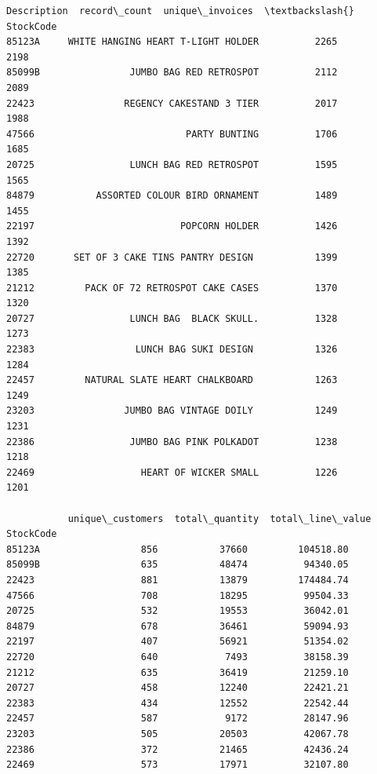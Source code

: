 \documentclass[11pt]{article}
\begin{document}
    
    \begin{Verbatim}[commandchars=\\\{\}]
                                  Description  record\_count  unique\_invoices  \textbackslash{}
StockCode                                                                      
85123A     WHITE HANGING HEART T-LIGHT HOLDER          2265             2198   
85099B                JUMBO BAG RED RETROSPOT          2112             2089   
22423                REGENCY CAKESTAND 3 TIER          2017             1988   
47566                           PARTY BUNTING          1706             1685   
20725                 LUNCH BAG RED RETROSPOT          1595             1565   
84879           ASSORTED COLOUR BIRD ORNAMENT          1489             1455   
22197                          POPCORN HOLDER          1426             1392   
22720       SET OF 3 CAKE TINS PANTRY DESIGN           1399             1385   
21212         PACK OF 72 RETROSPOT CAKE CASES          1370             1320   
20727                 LUNCH BAG  BLACK SKULL.          1328             1273   
22383                  LUNCH BAG SUKI DESIGN           1326             1284   
22457         NATURAL SLATE HEART CHALKBOARD           1263             1249   
23203                JUMBO BAG VINTAGE DOILY           1249             1231   
22386                 JUMBO BAG PINK POLKADOT          1238             1218   
22469                   HEART OF WICKER SMALL          1226             1201   

           unique\_customers  total\_quantity  total\_line\_value  
StockCode                                                      
85123A                  856           37660         104518.80  
85099B                  635           48474          94340.05  
22423                   881           13879         174484.74  
47566                   708           18295          99504.33  
20725                   532           19553          36042.01  
84879                   678           36461          59094.93  
22197                   407           56921          51354.02  
22720                   640            7493          38158.39  
21212                   635           36419          21259.10  
20727                   458           12240          22421.21  
22383                   434           12552          22542.44  
22457                   587            9172          28147.96  
23203                   505           20503          42067.78  
22386                   372           21465          42436.24  
22469                   573           17971          32107.80  
    \end{Verbatim}
\end{document}
